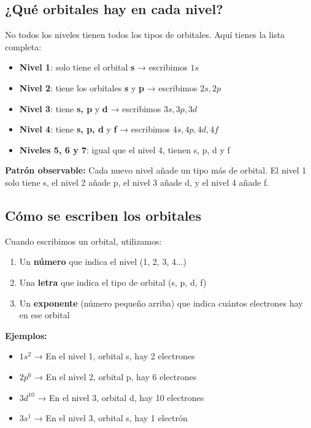 \subsection{¿Qué orbitales hay en cada nivel?}
No todos los niveles tienen todos los tipos de orbitales. Aquí tienes la lista completa:
\begin{itemize}
    \item \textbf{Nivel 1}: solo tiene el orbital \textbf{s} → escribimos \( 1s \)
    \item \textbf{Nivel 2}: tiene los orbitales \textbf{s} y \textbf{p} → escribimos \( 2s, 2p \)
    \item \textbf{Nivel 3}: tiene \textbf{s, p} y \textbf{d} → escribimos \( 3s, 3p, 3d \)
    \item \textbf{Nivel 4}: tiene \textbf{s, p, d} y \textbf{f} → escribimos \( 4s, 4p, 4d, 4f \)
    \item \textbf{Niveles 5, 6 y 7}: igual que el nivel 4, tienen s, p, d y f
\end{itemize}
\begin{remark}
    \textbf{Patrón observable:} Cada nuevo nivel añade un tipo más de orbital. El nivel 1 solo tiene s, el nivel 2 añade p, el nivel 3 añade d, y el nivel 4 añade f.
\end{remark}
\subsection{Cómo se escriben los orbitales}
Cuando escribimos un orbital, utilizamos:
\begin{enumerate}
    \item Un \textbf{número} que indica el nivel (1, 2, 3, 4...)
    \item Una \textbf{letra} que indica el tipo de orbital (s, p, d, f)
    \item Un \textbf{exponente} (número pequeño arriba) que indica cuántos electrones hay en ese orbital
\end{enumerate}
\textbf{Ejemplos:}
\begin{itemize}
    \item \( 1s^2 \) → En el nivel 1, orbital s, hay 2 electrones
    \item \( 2p^6 \) → En el nivel 2, orbital p, hay 6 electrones
    \item \( 3d^{10} \) → En el nivel 3, orbital d, hay 10 electrones
    \item \( 3s^1 \) → En el nivel 3, orbital s, hay 1 electrón
\end{itemize}
